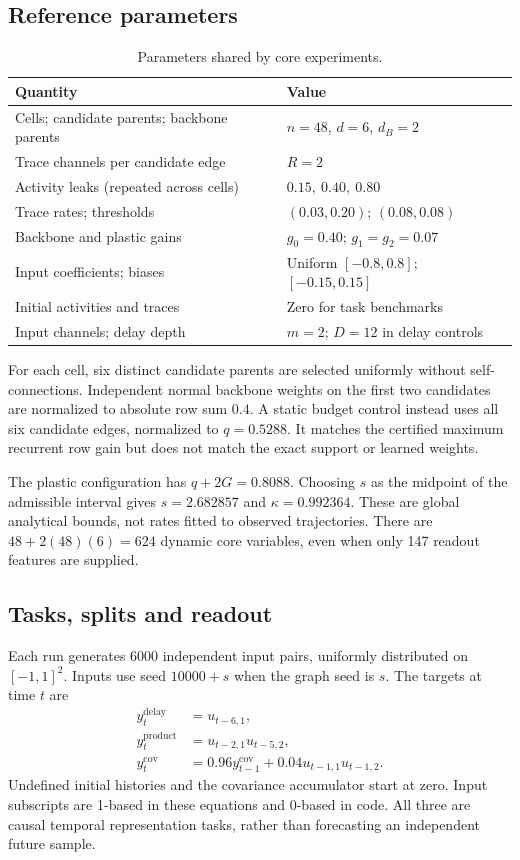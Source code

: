 \documentclass[11pt,a4paper]{article}
\theoremstyle{definition}\newtheorem{definition}[theorem]{Definition}
\begin{document}
\subsection{Reference parameters}
\begin{table}[H]\centering
\caption{Parameters shared by core experiments.}
\begin{tabular}{ll}\toprule
Quantity & Value \\\midrule
Cells; candidate parents; backbone parents & $n=48$, $d=6$, $d_B=2$ \\
Trace channels per candidate edge & $R=2$ \\
Activity leaks (repeated across cells) & $0.15,\ 0.40,\ 0.80$ \\
Trace rates; thresholds & $(0.03,0.20)$; $(0.08,0.08)$ \\
Backbone and plastic gains & $g_0=0.40$; $g_1=g_2=0.07$ \\
Input coefficients; biases & Uniform $[-0.8,0.8]$; $[-0.15,0.15]$ \\
Initial activities and traces & Zero for task benchmarks \\
Input channels; delay depth & $m=2$; $D=12$ in delay controls \\\bottomrule
\end{tabular}\label{tab:params}
\end{table}
For each cell, six distinct candidate parents are selected uniformly without self-connections. Independent normal backbone weights on the first two candidates are normalized to absolute row sum $0.4$. A static budget control instead uses all six candidate edges, normalized to $q=0.5288$. It matches the certified maximum recurrent row gain but does not match the exact support or learned weights.

The plastic configuration has $q+2G=0.8088$. Choosing $s$ as the midpoint of the admissible interval gives $s=2.682857$ and $\kappa=0.992364$. These are global analytical bounds, not rates fitted to observed trajectories. There are $48+2(48)(6)=624$ dynamic core variables, even when only 147 readout features are supplied.

\subsection{Tasks, splits and readout}
Each run generates 6000 independent input pairs, uniformly distributed on $[-1,1]^2$. Inputs use seed $10000+s$ when the graph seed is $s$. The targets at time $t$ are
\begin{align}
 y_t^{\mathrm{delay}}&=u_{t-6,1},\\
 y_t^{\mathrm{product}}&=u_{t-2,1}u_{t-5,2},\\
 y_t^{\mathrm{cov}}&=0.96y_{t-1}^{\mathrm{cov}}+0.04u_{t-1,1}u_{t-1,2}. \label{eq:targets}
\end{align}
Undefined initial histories and the covariance accumulator start at zero. Input subscripts are 1-based in these equations and 0-based in code. All three are causal temporal representation tasks, rather than forecasting an independent future sample.
\end{document}
